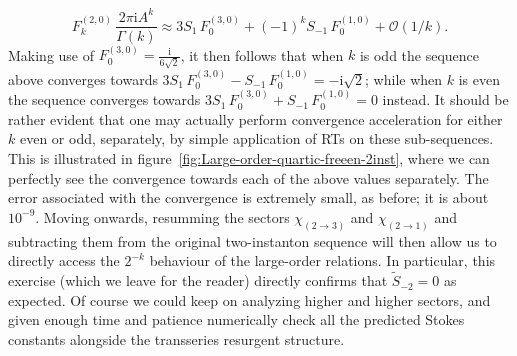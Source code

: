 \documentclass[11pt,a4paper]{article}
\newcommand{\be}{\begin{equation}}
\newcommand{\ee}{\end{equation}}
\newcommand{\rmi}{{\mathrm{i}}}
\begin{document}
%
\be
F_{k}^{(2,0)}\, \frac{2\pi\rmi A^k}{\Gamma(k)} \approx 3 S_1\, F_0^{(3,0)} + \left(-1\right)^k S_{-1}\, F_0^{(1,0)} + \mathcal{O}(1/k).
\ee
%
\noindent
Making use of $F_0^{(3,0)} = \frac{\rmi}{6\sqrt{2}}$, it then follows that when $k$ is odd the sequence above converges towards $3 S_1\, F_0^{(3,0)} - S_{-1}\, F_0^{(1,0)} = - \rmi \sqrt{2}$; while when $k$ is even the sequence converges towards $3 S_1\, F_0^{(3,0)} + S_{-1}\, F_0^{(1,0)} = 0$ instead. It should be rather evident that one may actually perform convergence acceleration for either $k$ even or odd, separately, by simple application of RTs on these sub-sequences. This is illustrated in figure~\ref{fig:Large-order-quartic-freeen-2inst}, where we can perfectly see the convergence towards each of the above values separately. The error associated with the convergence is  extremely small, as before; it is about $10^{-9}$. Moving onwards, resumming the sectors $\chi_{(2\rightarrow3)}$ and $\chi_{(2\rightarrow1)}$ and subtracting them from the original two-instanton sequence will then allow us to directly access the $2^{-k}$ behaviour of the large-order relations. In particular, this exercise (which we leave for the reader) directly confirms that $\widetilde{S}_{-2}=0$ as expected. Of course we could keep on analyzing higher and higher sectors, and given enough time and patience numerically check all the predicted Stokes constants alongside the transseries resurgent structure.
\end{document}
